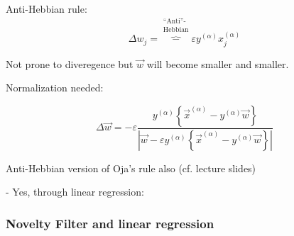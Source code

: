 
\begin{frame}\frametitle{\subsubsecname}


	\begin{block}{Anti-Hebbian rule:}
				\begin{equation}
				\Delta w_j = \overbrace{-}^{\substack{	\text{``Anti''-} \\ \text{Hebbian} }} \varepsilon y^{(\alpha)} x_j^{(\alpha)}
				\end{equation}
	\end{block}
	
	Not prone to diveregence but $\vec w$ will become smaller and smaller.
	\pause
	
	Normalization needed:
	
	\begin{equation}
		\Delta \vec{w} = - \varepsilon  \frac{y^{(\alpha)} \left\{ \vec{x}^{(\alpha)} - y^{(\alpha)} \vec{w} \right\}}{|{\vec{w} - \varepsilon y^{(\alpha)} \left\{ \vec{x}^{(\alpha)} - y^{(\alpha)} \vec{w} \right\}}|}
	\end{equation}
	
	Anti-Hebbian version of Oja's rule also (cf. lecture slides)

\end{frame}


\begin{frame}


\pause

- Yes, through linear regression:

\end{frame}

\newpage

\subsubsection{Novelty Filter and linear regression}

